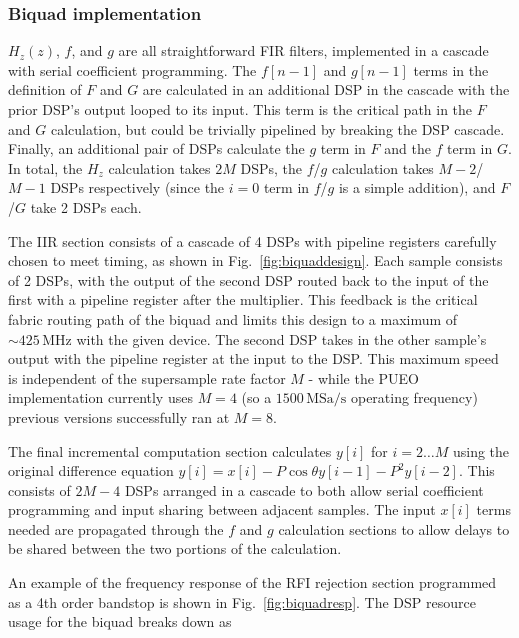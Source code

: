 \documentclass{IEEEtran}
\begin{document}
\subsubsection{Biquad implementation}

$H_{z}\left(z\right)$, $f$, and $g$ are all straightforward FIR filters,
implemented in a cascade with serial coefficient programming.
The $f\left[n-1\right]$ and $g\left[n-1\right]$ terms in the definition
of $F$ and $G$ are calculated in an additional DSP in the cascade with
the prior DSP's output looped to its input. This term is the critical
path in the $F$ and $G$ calculation, but could be trivially pipelined
by breaking the DSP cascade. Finally, an additional pair of DSPs
calculate the $g$ term in $F$ and the $f$ term in $G$. In total,
the $H_z$ calculation takes $2M$ DSPs, the $f$/$g$ calculation takes $M-2$/$M-1$
DSPs respectively (since the $i=0$ term in $f$/$g$ is a simple addition),
and $F$/$G$ take 2 DSPs each.

The IIR section consists of a cascade of 4 DSPs with pipeline
registers carefully chosen to meet timing, as shown in 
Fig.~\ref{fig:biquaddesign}. Each sample consists of 2 DSPs, with the
output of the second DSP routed back to the input of the first
with a pipeline register after the multiplier. This feedback is
the critical  fabric routing path of the biquad and
limits this design to a maximum of $\sim425\,\text{MHz}$ with
the given device. The second DSP takes in the other sample's output
with the pipeline register at the input to the DSP. This
maximum speed is independent of the supersample rate factor $M$ -
while the PUEO implementation currently uses $M=4$ (so a $1500\,\text{MSa/s}$
operating frequency) previous versions successfully ran at $M=8$.

The final incremental computation section calculates $y\left[i\right]$
for $i=2\ldots M$ using the original difference equation
$y\left[i\right]=x\left[i\right]-P\cos\theta y\left[i-1\right]-P^{2}y\left[i-2\right]$.
This consists of $2M-4$ DSPs arranged in a cascade to both allow
serial coefficient programming and input sharing between adjacent
samples. The input $x\left[i\right]$ terms needed are propagated through
the $f$ and $g$ calculation sections to allow delays to be shared
between the two portions of the calculation.

An example of the frequency response of the RFI rejection section
programmed as a 4th order bandstop is shown in Fig.~\ref{fig:biquadresp}.
The DSP resource usage for the biquad breaks down as
\end{document}
